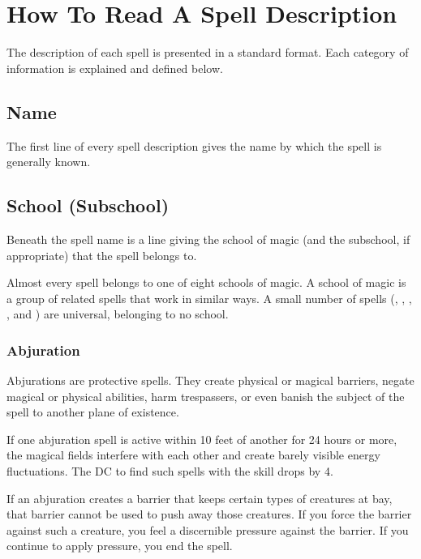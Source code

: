 \section{How To Read A Spell Description}

The description of each spell is presented in a standard format. Each category 
of information is explained and defined below.

\subsection{Name}

The first line of every spell description gives the name by which the spell is 
generally known.

\subsection{School (Subschool)}

Beneath the spell name is a line giving the school of magic (and the subschool, 
if appropriate) that the spell belongs to.

Almost every spell belongs to one of eight schools of magic. A school of magic 
is a group of related spells that work in similar ways. A small number of spells 
(, , , , and ) 
are universal, belonging to no school.

\subsubsection{Abjuration}

Abjurations are protective spells. They create physical or magical barriers, negate 
magical or physical abilities, harm trespassers, or even banish the subject of 
the spell to another plane of existence. 

If one abjuration spell is active within 10 feet of another for 24 hours or more, 
the magical fields interfere with each other and create barely visible energy fluctuations. 
The DC to find such spells with the  skill drops by 4.

If an abjuration creates a barrier that keeps certain types of creatures at bay, 
that barrier cannot be used to push away those creatures. If you force the barrier 
against such a creature, you feel a discernible pressure against the barrier. If 
you continue to apply pressure, you end the spell.

